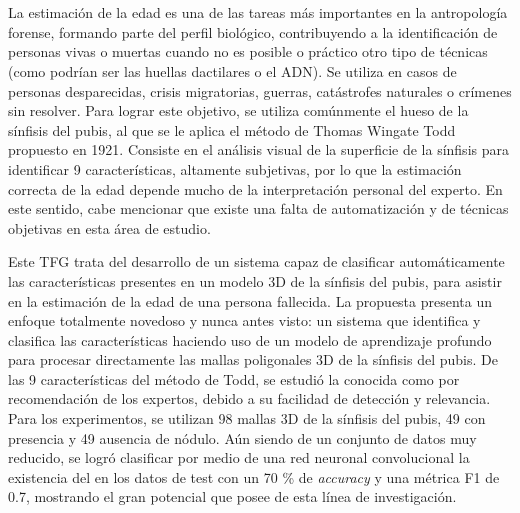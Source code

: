 \chapter*{}


%



\thispagestyle{empty}

\begin{center}
{\small \bfseries \myTitle}
\end{center}
\begin{center}
\myName
\end{center}



La estimación de la edad es una de las tareas más importantes en la antropología forense, formando parte del perfil biológico, contribuyendo a la identificación de personas vivas o muertas cuando no es posible o práctico otro tipo de técnicas (como podrían ser las huellas dactilares o el ADN). Se utiliza en casos de personas desparecidas, crisis migratorias, guerras, catástrofes naturales o crímenes sin resolver. Para lograr este objetivo, se utiliza comúnmente el hueso de la sínfisis del pubis, al que se le aplica el método de Thomas Wingate Todd propuesto en 1921. Consiste en el análisis visual de la superficie de la sínfisis para identificar 9 características, altamente subjetivas, por lo que la estimación correcta de la edad depende mucho de la interpretación personal del experto. En este sentido, cabe mencionar que existe una falta de automatización y de técnicas objetivas en esta área de estudio.

Este TFG trata del desarrollo de un sistema capaz de clasificar automáticamente las características presentes en un modelo 3D de la sínfisis del pubis, para asistir en la estimación de la edad de una persona fallecida. La propuesta presenta un enfoque totalmente novedoso y nunca antes visto: un sistema que identifica y clasifica las características haciendo uso de un modelo de aprendizaje profundo para procesar directamente las mallas poligonales 3D de la sínfisis del pubis. De las 9 características del método de Todd, se estudió la conocida como  por recomendación de los expertos, debido a su facilidad de detección y relevancia. Para los experimentos, se utilizan 98 mallas 3D de la sínfisis del pubis, 49 con presencia y 49 ausencia de nódulo. Aún siendo de un conjunto de datos muy reducido, se logró clasificar por medio de una red neuronal convolucional la existencia del  en los datos de test con un 70 \% de \textit{accuracy} y una métrica F1 de 0.7, mostrando el gran potencial que posee de esta línea de investigación.
\cleardoublepage


